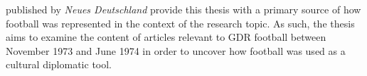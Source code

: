 published by \textit{Neues Deutschland} provide this thesis with a primary source of how football was represented in the context of the research topic. As such, the thesis aims to examine the content of articles relevant to GDR football between November 1973 and June 1974 in order to uncover how football was used as a cultural diplomatic tool.